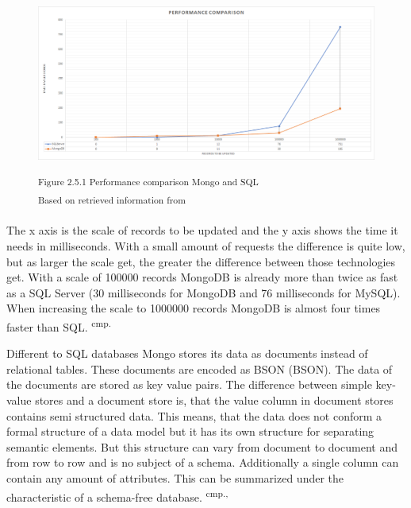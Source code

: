 \begin{figure}[h]
\centering
\includegraphics[width=\textwidth]{images/mongo_sql_comparison.png}

\textsuperscript{Figure 2.5.1 Performance comparison Mongo and SQL}\\
\textsuperscript{Based on retrieved information from \cite{34}}
\end{figure}


The x axis is the scale of records to be updated and the y axis shows the time it needs in milliseconds. With a small amount of requests the difference is quite low, but as larger the scale get, the greater the difference between those technologies get. With a scale of 100000 records MongoDB is already more than twice as fast as a SQL Server (30 milliseconds for MongoDB and 76 milliseconds for MySQL). When increasing the scale to 1000000 records MongoDB is almost four times faster than SQL.  \textsuperscript{cmp.\cite{34}}

Different to SQL databases Mongo stores its data as documents instead of relational tables. These documents are encoded as \acs{BSON} (\acl{BSON}). The data of the documents are stored as key value pairs. The difference between simple key-value stores and a document store is, that the value column in document stores contains semi structured data. This means, that the data does not conform a formal structure of a data model but it has its own structure for separating semantic elements. But this structure can vary from document to document and from row to row and is no subject of a schema. Additionally a single column can contain any amount of attributes. This can be summarized under the characteristic of a schema-free database. \textsuperscript{cmp.\cite{35}, \cite{36}}

